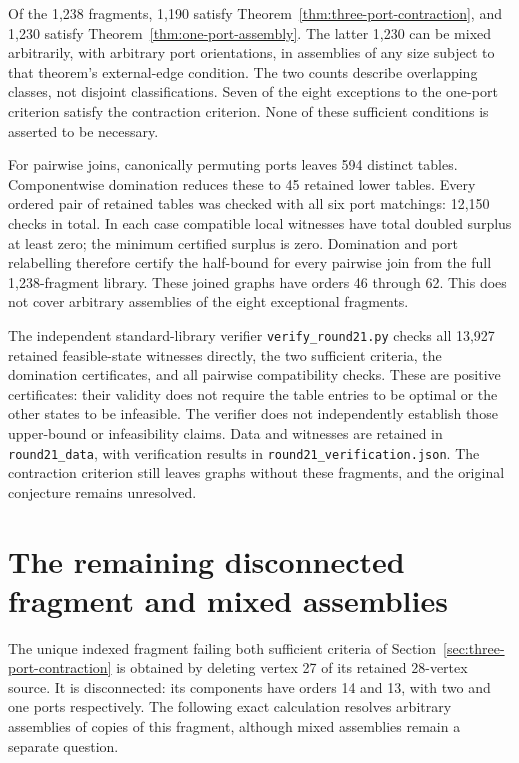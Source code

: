 \documentclass[11pt]{article}
\begin{document}
Of the 1,238 fragments, 1,190 satisfy
Theorem~\ref{thm:three-port-contraction}, and 1,230 satisfy
Theorem~\ref{thm:one-port-assembly}. The latter 1,230 can be mixed
arbitrarily, with arbitrary port orientations, in assemblies of any
size subject to that theorem's external-edge condition. The two
counts describe overlapping classes, not disjoint classifications.
Seven of the eight exceptions to the one-port criterion satisfy the
contraction criterion. None of these sufficient conditions is asserted
to be necessary.

For pairwise joins, canonically permuting ports leaves 594 distinct
tables. Componentwise domination reduces these to 45 retained lower
tables. Every ordered pair of retained tables was checked with all
six port matchings: 12,150 checks in total. In each case compatible
local witnesses have total doubled surplus at least zero; the
minimum certified surplus is zero. Domination and port relabelling
therefore certify the half-bound for every pairwise join from the
full 1,238-fragment library. These joined graphs have orders 46
through 62. This does not cover arbitrary assemblies of the eight
exceptional fragments.

The independent standard-library verifier \texttt{verify\_round21.py}
checks all 13,927 retained feasible-state witnesses directly, the two
sufficient criteria, the domination certificates, and all pairwise
compatibility checks. These are positive certificates: their validity
does not require the table entries to be optimal or the other states
to be infeasible. The verifier does not independently establish those
upper-bound or infeasibility claims. Data and witnesses are retained
in \texttt{round21\_data}, with verification results in
\texttt{round21\_verification.json}. The contraction criterion still
leaves graphs without these fragments, and the original conjecture
remains unresolved.

\section{The remaining disconnected fragment and mixed assemblies}
\label{sec:round22}
The unique indexed fragment failing both sufficient criteria of
Section~\ref{sec:three-port-contraction} is obtained by deleting
vertex 27 of its retained 28-vertex source. It is disconnected: its
components have orders 14 and 13, with two and one ports respectively.
The following exact calculation resolves arbitrary assemblies of
copies of this fragment, although mixed assemblies remain a separate
question.
\end{document}
